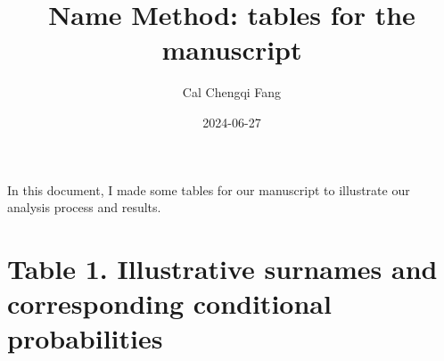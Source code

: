 \documentclass[
  landscape]{article}
\title{Name Method: tables for the manuscript}
\author{Cal Chengqi Fang}
\date{2024-06-27}
\begin{document}
\maketitle

In this document, I made some tables for our manuscript to illustrate
our analysis process and results.

\newpage

\hypertarget{table-1.-illustrative-surnames-and-corresponding-conditional-probabilities}{%
\section{Table 1. Illustrative surnames and corresponding conditional
probabilities}\label{table-1.-illustrative-surnames-and-corresponding-conditional-probabilities}}
\end{document}
